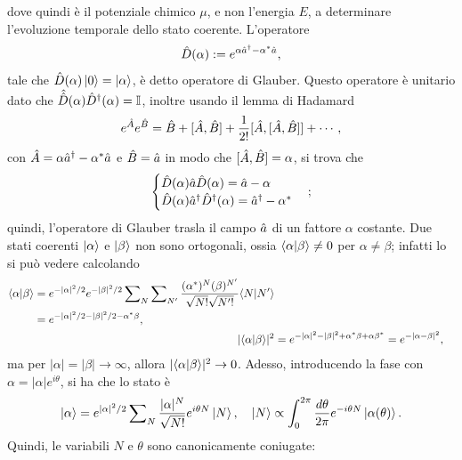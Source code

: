 dove quindi è il potenziale chimico $\mu$, e non l'energia $E$, a determinare l'evoluzione temporale dello stato coerente. L'operatore 
\begin{equation}
    \hat{D}(\alpha) := e^{\alpha\hat{a}^\dagger - \alpha^*\hat{a}},
\end{equation}
tale che $\hat{D}(\alpha)\ket{0} = \ket{\alpha}$, è detto operatore di Glauber. Questo operatore è unitario dato che $\hat{\hat{D}}(\alpha)\hat{D}^\dagger(\alpha) = \mathbb{I}$, inoltre usando il lemma di Hadamard
\begin{equation}
    e^{\hat{A}} e^{\hat{B}} = \hat{B} + [\hat{A},\hat{B}] + \frac{1}{2!}[\hat{A},[\hat{A},\hat{B}]] + \cdots,
\end{equation}
con $\hat{A} = \alpha\hat{a}^\dagger - \alpha^*\hat{a}$ e $\hat{B} = \hat{a}$ in modo che $[\hat{A},\hat{B}] = \alpha$, si trova che
\begin{equation}
    \begin{cases}
        \hat{D}(\alpha)\hat{a}\hat{D}(\alpha) = \hat{a} - \alpha \\
        \hat{D}(\alpha)\hat{a}^\dagger\hat{D}^\dagger(\alpha) = \hat{a}^\dagger - \alpha^*
    \end{cases};
\end{equation}
quindi, l'operatore di Glauber trasla il campo $\hat{a}$ di un fattore $\alpha$ costante. Due stati coerenti $\ket{\alpha}$ e $\ket{\beta}$ non sono ortogonali, ossia $\langle \alpha | \beta \rangle \neq 0$ per $\alpha \neq \beta$; infatti lo si può vedere calcolando
\begin{align}
    \begin{split}
        \langle \alpha | \beta \rangle &= e^{-|\alpha|^2/2}e^{-|\beta|^2/2}\sum\nolimits_N\sum\nolimits_{N'}\frac{(\alpha^*)^N(\beta)^{N'}}{\sqrt{N!}\sqrt{N'!}}\langle N | N' \rangle \\
        &= e^{-|\alpha|^2/2 -|\beta|^2/2 - \alpha^*\beta},
    \end{split} \\
    |\langle \alpha | \beta \rangle|^2 &= e^{-|\alpha|^2 -|\beta|^2 + \alpha^*\beta + \alpha\beta^*} = e^{-|\alpha - \beta|^2},
\end{align}
ma per $|\alpha| = |\beta| \to \infty$, allora $|\langle \alpha | \beta \rangle|^2 \to 0$. Adesso, introducendo la fase con $\alpha = |\alpha|e^{i\theta}$, si ha che lo stato è
\begin{equation}
    \ket{\alpha} = e^{|\alpha|^2/2}\sum\nolimits_N\frac{|\alpha|^N}{\sqrt{N!}}e^{i\theta N}\ket{N},\quad \ket{N} \propto \int_0^{2\pi}\frac{d\theta}{2\pi}e^{-i\theta N}\ket{\alpha(\theta)}.
\end{equation}
Quindi, le variabili $N$ e $\theta$ sono canonicamente coniugate:
